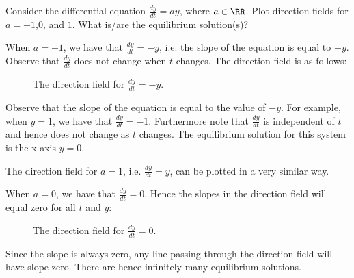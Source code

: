      \begin{example}
    Consider the differential equation $\frac{dy}{dt} = ay$,
    where $a \in \RR$. Plot direction fields for $a = -1$,$0$, and $1$. What is/are the equilibrium solution(s)?
    \end{example}
   \begin{solution}
   When $a = -1$, we have that $\frac{dy}{dt} = -y$, i.e. the slope of the equation is equal to $-y$. Observe that $\frac{dy}{dt}$ does not change when $t$ changes. The direction field is as follows:
   \begin{figure}[H]
    \centering
     \caption{The direction field for $\frac{dy}{dt} = -y$.}
 \end{figure}
    Observe that the slope of the equation is equal to the value of $-y$. For example, when $y = 1$, we have that $\frac{dy}{dt} = -1$. Furthermore note that $\frac{dy}{dt}$ is independent of $t$ and hence does not change as $t$ changes. The equilibrium solution for this system is the x-axis $y = 0$. 

    The direction field for $a = 1$, i.e. $\frac{dy}{dt} = y$, can be plotted in a very similar way.

    When $a = 0$, we have that $\frac{dy}{dt} = 0$. Hence the slopes in the direction field will equal zero for all $t$ and $y$:

    \begin{figure}[H]
        \centering
         \caption{The direction field for $\frac{dy}{dt} = 0$. }
     \end{figure}

     Since the slope is always zero, any line passing through the direction field will have slope zero. There are hence infinitely many equilibrium  solutions. \qedhere
   \end{solution}

